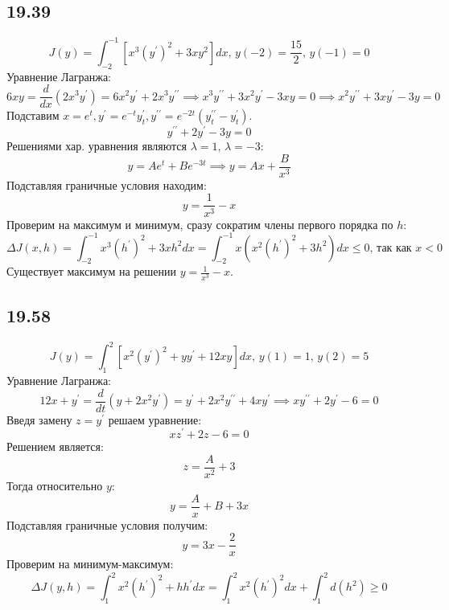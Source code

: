 \documentclass[12pt]{article}
\begin{document}
\subsection*{19.39}
\[
    J(y) = \int_{-2}^{-1} [x^3 (y^{\prime})^2 + 3xy^2]dx, \, y(-2) = \frac{15}{2}, \, y(-1) = 0
\]
Уравнение Лагранжа: 
\[
    6xy = \frac{d}{dx} (2x^3 y^{\prime}) = 6 x^2 y^{\prime} + 2x^3 y^{\prime\prime} \implies 
    x^3 y^{\prime\prime} + 3 x^2 y^{\prime} - 3xy = 0 \implies 
    x^2 y^{\prime\prime} + 3x y^{\prime} - 3y = 0
\]
Подставим $x = e^t, y^{\prime} = e^{-t} y^{\prime}_t, y^{\prime\prime} = e^{-2t} (y^{\prime\prime}_t - y^{\prime}_t)$. 
\[
    y^{\prime\prime} + 2y^{\prime} - 3y = 0
\]
Решениями хар. уравнения являются $\lambda = 1, \, \lambda = -3$: 
\[
    y = A e^t + B e^{-3t} \implies 
    y = A x + \frac{B}{x^3}
\] 
Подставляя граничные условия находим: 
\[
    y = \frac{1}{x^3} - x
\]
Проверим на максимум и минимум, сразу сократим члены первого порядка по $h$: 
\[
    \Delta J(x, h) = 
    \int_{-2}^{-1} x^3 (h^{\prime})^2 + 3x h^2 dx = 
    \int_{-2}^{-1} x \left( x^2 (h^{\prime})^2 + 3 h^2 \right) dx \leq 0, \, \text{так как $x < 0$}  
\]
Существует максимум на решении $y = \frac{1}{x^3} - x$. 
\subsection*{19.58}
\[
    J(y) = \int_{1}^{2} \left[ x^2 (y^{\prime})^2 + y y^{\prime} + 12xy \right] dx, \, y(1) = 1, \, y(2) = 5
\]
Уравнение Лагранжа: 
\[
    12x + y^{\prime} = \frac{d}{dt} \left( y + 2 x^2 y^{\prime} \right) = 
    y^{\prime} + 2x^2 y^{\prime\prime} + 4 x y^{\prime} \implies 
    x y^{\prime\prime} + 2 y^{\prime} - 6 = 0 
\]
Введя замену $z = y^{\prime}$ решаем уравнение: 
\[
    xz^{\prime} + 2z - 6 = 0
\] 
Решением является: 
\[
    z = \frac{A}{x^2} + 3
\]
Тогда относительно $y$: 
\[
    y = \frac{A}{x} + B + 3x
\]
Подставляя граничные условия получим: 
\[
    y = 3x - \frac{2}{x}
\]
Проверим на минимум-максимум:
\[
    \Delta J(y, h) = \int_{1}^{2} x^2(h^{\prime})^2 + h h^{\prime} dx = 
    \int_{1}^{2} x^2(h^{\prime})^2 dx + 
    \int_{1}^{2} d (h^2) \geq 0
\]  
\end{document}
